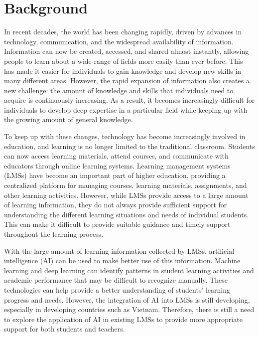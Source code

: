 \section{Background}
\begingroup
\setlength{\parskip}{0.5em}
In recent decades, the world has been changing rapidly, driven by advances in technology, communication, and the widespread availability of information. Information can now be created, accessed, and shared almost instantly, allowing people to learn about a wide range of fields more easily than ever before. This has made it easier for individuals to gain knowledge and develop new skills in many different areas. However, the rapid expansion of information also creates a new challenge: the amount of knowledge and skills that individuals need to acquire is continuously increasing. As a result, it becomes increasingly difficult for individuals to develop deep expertise in a particular field while keeping up with the growing amount of general knowledge.


\noindent To keep up with these changes, technology has become increasingly involved in education, and learning is no longer limited to the traditional classroom. Students can now access learning materials, attend courses, and communicate with educators through online learning systems. Learning management systems (LMSs) have become an important part of higher education, providing a centralized platform for managing courses, learning materials, assignments, and other learning activities. However, while LMSs provide access to a large amount of learning information, they do not always provide sufficient support for understanding the different learning situations and needs of individual students. This can make it difficult to provide suitable guidance and timely support throughout the learning process.

\noindent With the large amount of learning information collected by LMSs, artificial intelligence (AI) can be used to make better use of this information. Machine learning and deep learning can identify patterns in student learning activities and academic performance that may be difficult to recognize manually. These technologies can help provide a better understanding of students' learning progress and needs. However, the integration of AI into LMSs is still developing, especially in developing countries such as Vietnam. Therefore, there is still a need to explore the application of AI in existing LMSs to provide more appropriate support for both students and teachers.

\endgroup

